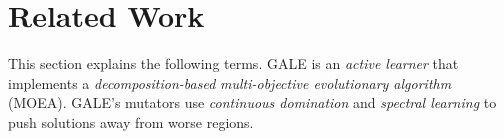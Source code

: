 \documentclass[10pt,journal,compsoc]{IEEEtran}
\newcommand{\fig}[1]{Figure~\ref{fig:#1}}
\begin{document}
\section{Related Work}
This section explains the following terms.
GALE is an {\em active learner} that implements a {\em decomposition-based} {\em multi-objective evolutionary algorithm} (MOEA).
GALE's mutators use  {\em continuous domination} and {\em spectral learning}
to push solutions away from worse regions.




\end{document}

